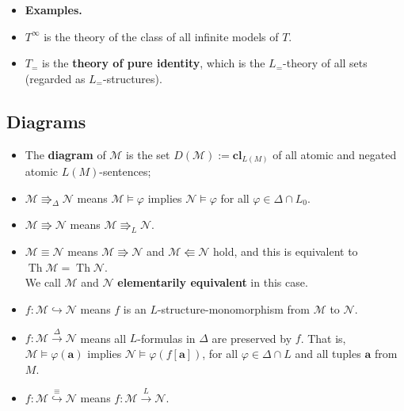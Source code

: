 \documentclass[a4paper,UKenglish,cleveref,autoref,thm-restate,12pt]{lipics-v2021-wjd}
\newcommand{\<}{\langle}
\renewcommand{\>}{\rangle}
\begin{document}
\begin{itemize}
\item
  \textbf{Examples.}
\item
  \(T^\infty\) is the theory of the class of all infinite models of
  \(T\).
\item
  \(T_=\) is the \textbf{theory of pure identity}, which is the
  \(L_=\)-theory of all sets (regarded as \(L_=\)-structures).
\end{itemize}


\subsection{Diagrams}\label{diagrams}

\begin{itemize}
\item
  The \textbf{diagram} of \(\mathcal M\) is the set
  \(D(\mathcal M) := \mathbf{cl}_{L(M)}\) of all atomic and negated
  atomic \(L(M)\)-sentences;
\item
  \(\mathcal M \Rrightarrow_{\Delta} \mathcal N\) means
  \(\mathcal M \vDash \varphi\) implies \(\mathcal N \vDash \varphi\)
  for all \(\varphi \in \Delta \cap L_0\).
\item
  \(\mathcal M \Rrightarrow \mathcal N\) means
  \(\mathcal M \Rrightarrow_{L} \mathcal N\).
\item
  \(\mathcal M \equiv \mathcal N\) means
  \(\mathcal M \Rrightarrow \mathcal N\) and
  \(\mathcal M \Lleftarrow \mathcal N\) hold, and this is equivalent to
  \(\operatorname{Th} \mathcal M = \operatorname{Th} \mathcal N\).\\
  We call \(\mathcal M\) and \(\mathcal N\) \textbf{elementarily
  equivalent} in this case.
\item
  \(f \colon \mathcal M \hookrightarrow \mathcal N\) means \(f\) is an
  \(L\)-structure-monomorphism from \(\mathcal M\) to \(\mathcal N\).
\item
  \(f \colon \mathcal M \stackrel{\Delta}{\longrightarrow} \mathcal N\)
  means all \(L\)-formulas in \(\Delta\) are preserved by \(f\). That
  is,\\
  \(\mathcal M \vDash \varphi(\mathbf a)\) implies
  \(\mathcal N \vDash \varphi(f[\mathbf a])\), for all
  \(\varphi \in \Delta\cap L\) and all tuples \(\mathbf a\) from \(M\).
\item
  \(f \colon \mathcal M \stackrel{\equiv}{\hookrightarrow} \mathcal N\)
  means
  \(f \colon \mathcal M \stackrel{L}{\longrightarrow} \mathcal N\).
\end{itemize}
\end{document}
